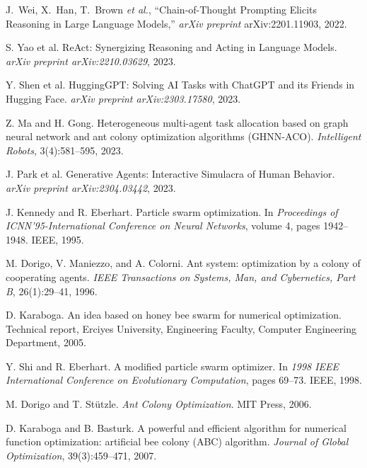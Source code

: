 \documentclass{article}
\begin{document}

\begin{thebibliography}{99}

J.~Wei, X.~Han, T.~Brown \emph{et al.},
“Chain-of-Thought Prompting Elicits Reasoning in Large Language Models,”
\emph{arXiv preprint} arXiv:2201.11903, 2022.

S. Yao et al.
\newblock ReAct: Synergizing Reasoning and Acting in Language Models.
\newblock \emph{arXiv preprint arXiv:2210.03629}, 2023.

Y. Shen et al.
\newblock HuggingGPT: Solving AI Tasks with ChatGPT and its Friends in Hugging Face.
\newblock \emph{arXiv preprint arXiv:2303.17580}, 2023.

Z. Ma and H. Gong.
\newblock Heterogeneous multi-agent task allocation based on graph neural network and ant colony optimization algorithms (GHNN-ACO).
\newblock \emph{Intelligent Robots}, 3(4):581–595, 2023.

J. Park et al.
\newblock Generative Agents: Interactive Simulacra of Human Behavior.
\newblock \emph{arXiv preprint arXiv:2304.03442}, 2023.

J. Kennedy and R. Eberhart.
\newblock Particle swarm optimization.
\newblock In \emph{Proceedings of ICNN'95-International Conference on Neural Networks}, volume 4, pages 1942–1948. IEEE, 1995.

M. Dorigo, V. Maniezzo, and A. Colorni.
\newblock Ant system: optimization by a colony of cooperating agents.
\newblock \emph{IEEE Transactions on Systems, Man, and Cybernetics, Part B}, 26(1):29–41, 1996.

D. Karaboga.
\newblock An idea based on honey bee swarm for numerical optimization.
\newblock Technical report, Erciyes University, Engineering Faculty, Computer Engineering Department, 2005.

Y. Shi and R. Eberhart.
\newblock A modified particle swarm optimizer.
\newblock In \emph{1998 IEEE International Conference on Evolutionary Computation}, pages 69–73. IEEE, 1998.

M. Dorigo and T. Stützle.
\newblock \emph{Ant Colony Optimization}.
\newblock MIT Press, 2006.

D. Karaboga and B. Basturk.
\newblock A powerful and efficient algorithm for numerical function optimization: artificial bee colony (ABC) algorithm.
\newblock \emph{Journal of Global Optimization}, 39(3):459–471, 2007.


\end{thebibliography}
\end{document}

